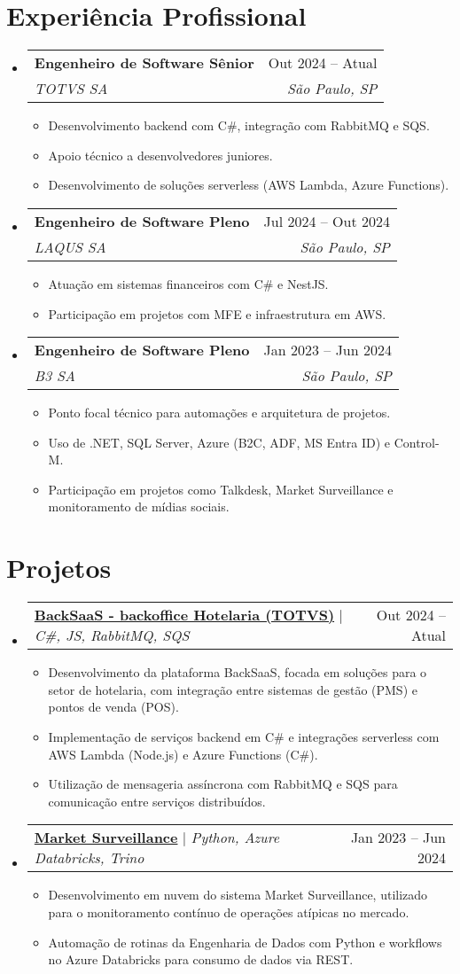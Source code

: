 \documentclass[letterpaper,11pt]{article}
\makeatletter
\newcommand{\resumeItem}[1]{
  \item\small{
    {#1 \vspace{-2pt}}
  }
}
\newcommand{\resumeSubheading}[4]{
  \vspace{-2pt}\item
    \begin{tabular*}{0.97\textwidth}[t]{l@{\extracolsep{\fill}}r}
      \textbf{#1} & #2 \\
      \textit{\small#3} & \textit{\small #4} \\
    \end{tabular*}\vspace{-7pt}
}
\newcommand{\resumeProjectHeading}[2]{
    \item
    \begin{tabular*}{0.97\textwidth}{l@{\extracolsep{\fill}}r}
      \small#1 & #2 \\
    \end{tabular*}\vspace{-7pt}
}
\newcommand{\resumeSubHeadingListStart}{\begin{itemize}[leftmargin=0.15in, label={}]}
\newcommand{\resumeSubHeadingListEnd}{\end{itemize}}
\newcommand{\resumeItemListStart}{\begin{itemize}}
\newcommand{\resumeItemListEnd}{\end{itemize}\vspace{-5pt}}
\makeatother
\begin{document}
\section{Experiência Profissional}
  \resumeSubHeadingListStart

    \resumeSubheading
      {Engenheiro de Software Sênior}{Out 2024 -- Atual}
      {TOTVS SA}{São Paulo, SP}
      \resumeItemListStart
        \resumeItem{Desenvolvimento backend com C\#, integração com RabbitMQ e SQS.}
        \resumeItem{Apoio técnico a desenvolvedores juniores.}
        \resumeItem{Desenvolvimento de soluções serverless (AWS Lambda, Azure Functions).}
      \resumeItemListEnd
      
    \resumeSubheading
      {Engenheiro de Software Pleno}{Jul 2024 -- Out 2024}
      {LAQUS SA}{São Paulo, SP}
      \resumeItemListStart
        \resumeItem{Atuação em sistemas financeiros com C\# e NestJS.}
        \resumeItem{Participação em projetos com MFE e infraestrutura em AWS.}
    \resumeItemListEnd

    \resumeSubheading
      {Engenheiro de Software Pleno}{Jan 2023 -- Jun 2024}
      {B3 SA}{São Paulo, SP}
      \resumeItemListStart
        \resumeItem{Ponto focal técnico para automações e arquitetura de projetos.}
        \resumeItem{Uso de .NET, SQL Server, Azure (B2C, ADF, MS Entra ID) e Control-M.}
        \resumeItem{Participação em projetos como Talkdesk, Market Surveillance e monitoramento de mídias sociais.}
      \resumeItemListEnd

  \resumeSubHeadingListEnd

\section{Projetos}
  \resumeSubHeadingListStart

    \resumeProjectHeading
      {\textbf{\href{https://tdn.totvs.com/display/public/CMNET/BACK+SaaS}{BackSaaS - backoffice Hotelaria (TOTVS)}} $|$ \emph{C\#, JS, RabbitMQ, SQS}}{Out 2024 -- Atual}
      \resumeItemListStart
        \resumeItem{Desenvolvimento da plataforma BackSaaS, focada em soluções para o setor de hotelaria, com integração entre sistemas de gestão (PMS) e pontos de venda (POS).}
        \resumeItem{Implementação de serviços backend em C\# e integrações serverless com AWS Lambda (Node.js) e Azure Functions (C\#).}
        \resumeItem{Utilização de mensageria assíncrona com RabbitMQ e SQS para comunicação entre serviços distribuídos.}
      \resumeItemListEnd

    \resumeProjectHeading        
    {\textbf{\href{https://www.bsmsupervisao.com.br/w/curso-sobre-market-surveillance-e-compliance-em-parceria-com-o-insper}{Market Surveillance}} $|$ \emph{Python, Azure Databricks, Trino}}{Jan 2023 -- Jun 2024}
      \resumeItemListStart
        \resumeItem{Desenvolvimento em nuvem do sistema Market Surveillance, utilizado para o monitoramento contínuo de operações atípicas no mercado.}
        \resumeItem{Automação de rotinas da Engenharia de Dados com Python e workflows no Azure Databricks para consumo de dados via REST.}
      \resumeItemListEnd

  \resumeSubHeadingListEnd
\end{document}
